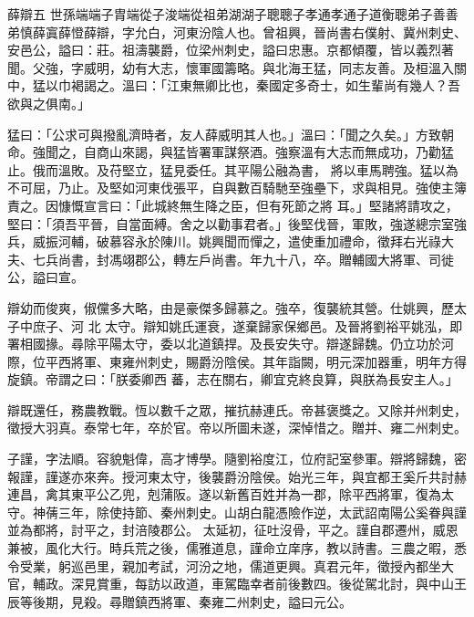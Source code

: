 
\begin{pinyinscope}

 薛辯五
 世孫端端子胄端從子浚端從祖弟湖湖子聰聰子孝通孝通子道衡聰弟子善善弟慎薛寘薛憕薛辯，字允白，河東汾陰人也。曾祖興，晉尚書右僕射、冀州刺史、安邑公，謚曰：莊。祖濤襲爵，位梁州刺史，謚曰忠惠。京都傾覆，皆以義烈著聞。父強，字威明，幼有大志，懷軍國籌略。與北海王猛，同志友善。及桓溫入關中，猛以巾褐謁之。溫曰：「江東無卿比也，秦國定多奇士，如生輩尚有幾人？吾欲與之俱南。」



 猛曰：「公求可與撥亂濟時者，友人薛威明其人也。」溫曰：「聞之久矣。」方致朝命。強聞之，自商山來謁，與猛皆署軍謀祭酒。強察溫有大志而無成功，乃勸猛止。俄而溫敗。及苻堅立，猛見委任。其平陽公融為書，
 將以車馬聘強。猛以為不可屈，乃止。及堅如河東伐張平，自與數百騎馳至強壘下，求與相見。強使主簿責之。因慷慨宣言曰：「此城終無生降之臣，但有死節之將
 耳。」堅諸將請攻之，堅曰：「須吾平晉，自當面縛。舍之以勸事君者。」後堅伐晉，軍敗，強遂總宗室強兵，威振河輔，破慕容永於陳川。姚興聞而憚之，遣使重加禮命，徵拜右光祿大夫、七兵尚書，封馮翊郡公，轉左戶尚書。年九十八，卒。贈輔國大將軍、司徙公，謚曰宣。



 辯幼而俊爽，俶儻多大略，由是豪傑多歸慕之。強卒，復襲統其營。仕姚興，歷太子中庶子、河
 北
 太守。辯知姚氏運衰，遂棄歸家保鄉邑。及晉將劉裕平姚泓，即署相國掾。尋除平陽太守，委以北道鎮捍。及長安失守。辯遂歸魏。仍立功於河際，位平西將軍、東雍州刺史，賜爵汾陰侯。其年詣闕，明元深加器重，明年方得旋鎮。帝謂之曰：「朕委卿西
 蕃，志在關右，卿宜克終良算，與朕為長安主人。」



 辯既還任，務農教戰。恆以數千之眾，摧抗赫連氏。帝甚褒獎之。又除并州刺史，徵授大羽真。泰常七年，卒於官。帝以所圖未遂，深悼惜之。贈并、雍二州刺史。



 子謹，字法順。容貌魁偉，高才博學。隨劉裕度江，位府記室參軍。辯將歸魏，密報謹，謹遂亦來奔。授河東太守，後襲爵汾陰侯。始光三年，與宜都王奚斤共討赫連昌，禽其東平公乙兜，剋蒲阪。遂以新舊百姓并為一郡，除平西將軍，復為太守。神蒨三年，除使持節、秦州刺史。山胡白龍憑險作逆，太武詔南陽公奚眷與謹並為都將，討平之，封涪陵郡公。
 太延初，征吐沒骨，平之。謹自郡遷州，威恩兼被，風化大行。時兵荒之後，儒雅道息，謹命立庠序，教以詩書。三農之暇，悉令受業，躬巡邑里，親加考試，河汾之地，儒道更興。真君元年，徵授內都坐大官，輔政。深見賞重，每訪以政道，車駕臨幸者前後數四。後從駕北討，與中山王辰等後期，見殺。尋贈鎮西將軍、秦雍二州刺史，謚曰元公。




\end{pinyinscope}
